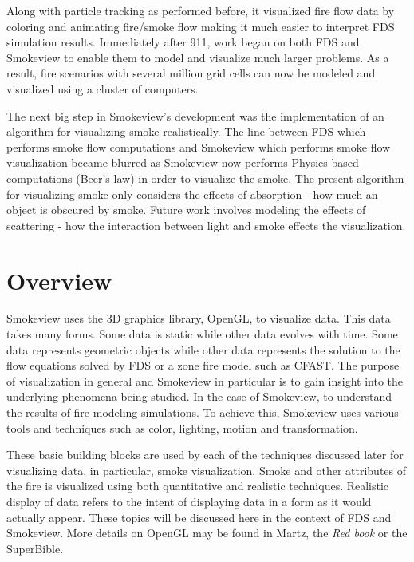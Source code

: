 \documentclass[11pt,twoside]{book}
\begin{document}
Along with particle tracking as performed before, it visualized fire flow data by coloring and animating fire/smoke flow making it much easier to interpret FDS simulation results.  Immediately after 911, work began on both FDS and Smokeview to enable them to model and visualize much larger problems.  As a result, fire scenarios with several million grid cells can now be modeled and visualized using a cluster of computers.

The next big step in Smokeview's development was the implementation of an algorithm for visualizing smoke realistically.   The line between FDS which performs smoke flow computations and Smokeview which performs smoke flow visualization became blurred as Smokeview now performs Physics based computations (Beer's law) in order to visualize the smoke.  The present algorithm for visualizing smoke only considers the effects of absorption - how much an object is obscured by smoke.  Future work involves modeling the effects of scattering - how the interaction between light and smoke effects the visualization.


\section{Overview}
Smokeview uses the 3D graphics library, OpenGL, to visualize data.
This data takes many forms.  Some data is static while other data evolves with time.
Some data represents geometric objects while other data represents the solution to the flow equations solved by FDS or a zone fire model such as CFAST.
The purpose of visualization in general and Smokeview in particular is to gain insight into the underlying phenomena being studied.  In the case of Smokeview, to
understand the results of fire modeling simulations.  To achieve this, Smokeview
uses various tools and techniques such as color, lighting, motion and transformation.

These basic building blocks are used by each of the techniques discussed later for visualizing data, in particular, smoke visualization.  Smoke and other attributes of the fire is visualized using both quantitative and realistic techniques.  Realistic display of data refers to the intent of displaying data in a form as it would actually appear.
These topics will be discussed here in the context of FDS and Smokeview.
More details on OpenGL may be found in Martz\cite{martz:06},
the {\em Red book}\cite{OpenGLRed} or the SuperBible\cite{SUPERBIBLE}.

%
%
\end{document}
